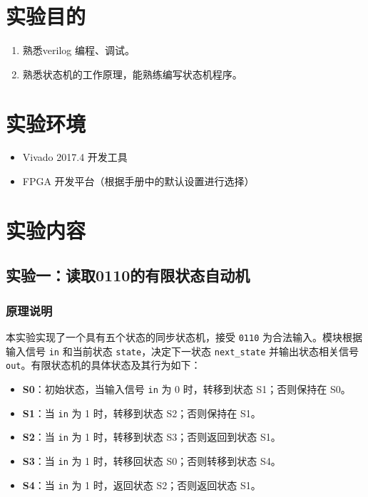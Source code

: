 \documentclass[zihao=5, UTF8]{article}
\theoremstyle{MyLineTheoremStyle} %
\theoremstyle{MyBlockTheoremStyle} %
\theoremstyle{MySubsubsectionStyle} %
\begin{document}
\section{实验目的}\thispagestyle{fancy}
\begin{enumerate}
    \item 熟悉verilog 编程、调试。
    \item 熟悉状态机的工作原理，能熟练编写状态机程序。
\end{enumerate}

\section{实验环境}
\begin{itemize}
    \item Vivado 2017.4 开发工具
    \item FPGA 开发平台（根据手册中的默认设置进行选择）
\end{itemize}


\section{实验内容}


\subsection{实验一：读取0110的有限状态自动机}  
\subsubsection{原理说明}  
本实验实现了一个具有五个状态的同步状态机，接受 \texttt{0110} 为合法输入。模块根据输入信号 \texttt{in} 和当前状态 \texttt{state}，决定下一状态 \texttt{next\_state} 并输出状态相关信号 \texttt{out}。有限状态机的具体状态及其行为如下：  
\begin{itemize}  
    \item \textbf{S0}：初始状态，当输入信号 \texttt{in} 为 0 时，转移到状态 S1；否则保持在 S0。  
    \item \textbf{S1}：当 \texttt{in} 为 1 时，转移到状态 S2；否则保持在 S1。  
    \item \textbf{S2}：当 \texttt{in} 为 1 时，转移到状态 S3；否则返回到状态 S1。  
    \item \textbf{S3}：当 \texttt{in} 为 1 时，转移回状态 S0；否则转移到状态 S4。  
    \item \textbf{S4}：当 \texttt{in} 为 1 时，返回状态 S2；否则返回状态 S1。  
\end{itemize}  
\end{document}
